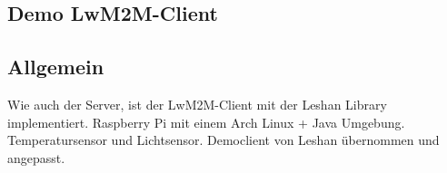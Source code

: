 \newpage

\subsection{Demo LwM2M-Client}
\subsection{Allgemein}
Wie auch der Server, ist der LwM2M-Client mit der Leshan Library implementiert. 
Raspberry Pi mit einem Arch Linux + Java Umgebung.
Temperatursensor und Lichtsensor.
Democlient von Leshan übernommen und angepasst.